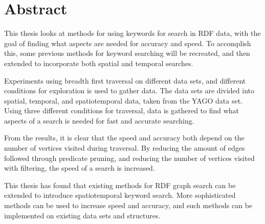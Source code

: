 \section*{Abstract}
This thesis looks at methods for using keywords for search in RDF data, with the goal of finding what aspects are needed for accuracy and speed. To accomplish this, some previous methods for keyword searching will be recreated, and then extended to incorporate both spatial and temporal searches.  

Experiments using breadth first traversal on different data sets, and different conditions for exploration is used to gather data. The data sets are divided into spatial, temporal, and spatiotemporal data, taken from the YAGO data set. Using three different conditions for traversal, data is gathered to find what aspects of a search is needed for fast and accurate searching. 

From the results, it is clear that the speed and accuracy both depend on the number of vertices visited during traversal. By reducing the amount of edges followed through predicate pruning, and reducing the number of vertices visited with filtering, the speed of a search is increased. 

This thesis has found that existing methods for RDF graph search can be extended to introduce spatiotemporal keyword search. More sophisticated methods can be used to increase speed and accuracy, and such methods can be implemented on existing data sets and structures. 